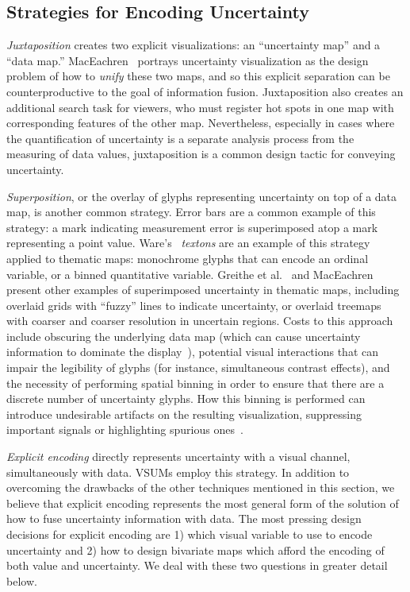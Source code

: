 \documentclass{vgtc}                          %
\begin{document}
\subsection{Strategies for Encoding Uncertainty}

\emph{Juxtaposition} creates two explicit visualizations: an ``uncertainty map'' and a ``data map.'' MacEachren~\cite{maceachren1992visualizing} portrays uncertainty visualization as the design problem of how to \emph{unify} these two maps, and so this explicit separation can be counterproductive to the goal of information fusion. Juxtaposition also creates an additional search task for viewers, who must register hot spots in one map with corresponding features of the other map. Nevertheless, especially in cases where the quantification of uncertainty is a separate analysis process from the measuring of data values, juxtaposition is a common design tactic for conveying uncertainty.

\emph{Superposition}, or the overlay of glyphs representing uncertainty on top of a data map, is another common strategy. Error bars are a common example of this strategy: a mark indicating measurement error is superimposed atop a mark representing a point value. Ware's~\cite{ware2009quantitative} \emph{textons} are an example of this strategy applied to thematic maps: monochrome glyphs that can encode an ordinal variable, or a binned quantitative variable. Greithe et al.~\cite{griethe2006visualization} and MacEachren~\cite{maceachren1992visualizing,maceachren1998visualizing} present other examples of superimposed uncertainty in thematic maps, including overlaid grids with ``fuzzy'' lines to indicate uncertainty, or overlaid treemaps with coarser and coarser resolution in uncertain regions. Costs to this approach include obscuring the underlying data map (which can cause uncertainty information to dominate the display~\cite{brodlie2012review}), potential visual interactions that can impair the legibility of glyphs (for instance, simultaneous contrast effects), and the necessity of performing spatial binning in order to ensure that there are a discrete number of uncertainty glyphs. How this binning is performed can introduce undesirable artifacts on the resulting visualization, suppressing important signals or highlighting spurious ones~\cite{battersby2016shapes}.

\emph{Explicit encoding} directly represents uncertainty with a visual channel, simultaneously with data. VSUMs employ this strategy. In addition to overcoming the drawbacks of the other techniques mentioned in this section, we believe that explicit encoding represents the most general form of the solution of how to fuse uncertainty information with data. The most pressing design decisions for explicit encoding are 1) which visual variable to use to encode uncertainty and 2) how to design bivariate maps which afford the encoding of both value and uncertainty. We deal with these two questions in greater detail below.
\end{document}
